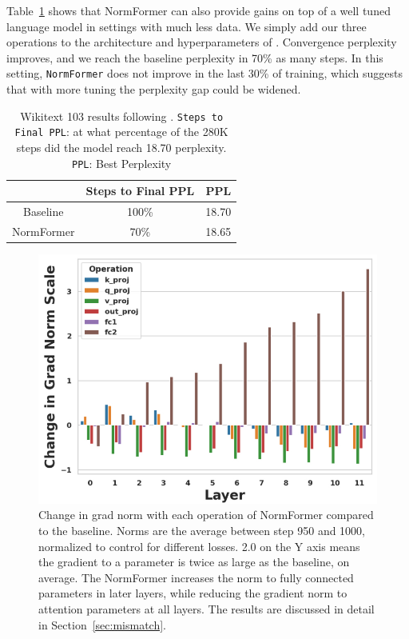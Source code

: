 \documentclass{article} %
\begin{document}
Table~\ref{tab:wikitext} shows that NormFormer can also provide gains on top of a well tuned language model in settings with much less data. We simply add our three operations to the architecture and hyperparameters of \citet{baevski2018adaptive}. Convergence perplexity improves, and we reach the baseline perplexity in 70\% as many steps. In this setting, \texttt{NormFormer} does not improve in the last 30\% of training, which suggests that with more tuning the perplexity gap could be widened.

\begin{table}[htpb]
\centering
\begin{tabular}{ccc}
\toprule
{} & Steps to Final PPL &  PPL \\
\midrule
Baseline   &            100\% &      18.70 \\
NormFormer &            70\% &      18.65 \\
\bottomrule
\end{tabular}
\caption{Wikitext 103 results following \citet{baevski2018adaptive}. \texttt{Steps to Final PPL}: at what percentage of the 280K steps did the model reach 18.70 perplexity.
\texttt{PPL}: Best Perplexity}
\label{tab:wikitext}
\end{table}
\begin{figure}[ht]
\centering
\includegraphics[scale=0.25]{all_params_scale_smaller.jpg}
\caption{Change in grad norm with each operation of NormFormer compared to the baseline. Norms are the average between step 950 and 1000, normalized to control for different losses. 2.0 on the Y axis means the gradient to a parameter is twice as large as the baseline, on average. The NormFormer increases the norm to fully connected parameters in later layers, while reducing the gradient norm to attention parameters at all layers. The results are discussed in detail in Section~\ref{sec:mismatch}.}
\label{fig:gnorm_all}
\end{figure}
\end{document}
